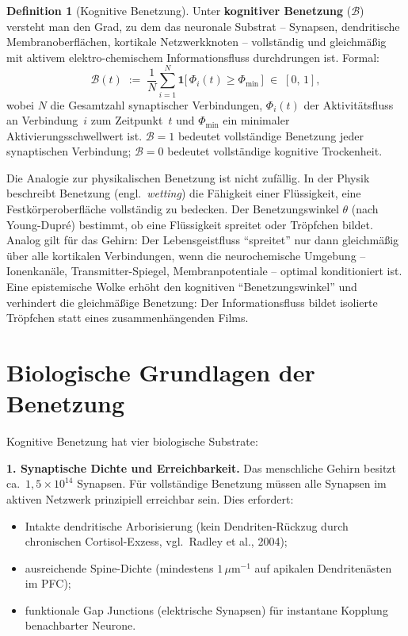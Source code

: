 ﻿\documentclass[12pt,a4paper]{report}
\theoremstyle{plain}
\theoremstyle{definition}
\newtheorem{definition}[theorem]{Definition}
\theoremstyle{remark}
\begin{document}
	\begin{definition}[Kognitive Benetzung]
		\label{def:benetzung}
		Unter \textbf{kognitiver Benetzung} ($\mathcal{B}$) versteht man den Grad,
		zu dem das neuronale Substrat -- Synapsen, dendritische Membranoberflächen,
		kortikale Netzwerkknoten -- vollständig und gleichmäßig mit aktivem
		elektro-chemischem Informationsfluss durchdrungen ist.
		Formal:
		\[
		\mathcal{B}(t) \;:=\; \frac{1}{N}\sum_{i=1}^{N}
		\mathbf{1}\bigl[\,\Phi_i(t) \geq \Phi_{\min}\,\bigr]
		\;\in\; [0,\,1],
		\]
		wobei $N$ die Gesamtzahl synaptischer Verbindungen,
		$\Phi_i(t)$ der Aktivitätsfluss an Verbindung~$i$ zum Zeitpunkt~$t$
		und $\Phi_{\min}$ ein minimaler Aktivierungsschwellwert ist.
		$\mathcal{B} = 1$ bedeutet vollständige Benetzung jeder synaptischen
		Verbindung; $\mathcal{B} = 0$ bedeutet vollständige kognitive Trockenheit.
	\end{definition}

	Die Analogie zur physikalischen Benetzung ist nicht zufällig.
	In der Physik beschreibt Benetzung (engl.\ \textit{wetting}) die Fähigkeit
	einer Flüssigkeit, eine Festkörperoberfläche vollständig zu bedecken.
	Der Benetzungswinkel $\theta$ (nach Young-Dupré) bestimmt, ob eine
	Flüssigkeit spreitet oder Tröpfchen bildet. Analog gilt für das Gehirn:
	Der Lebensgeistfluss ``spreitet'' nur dann gleichmäßig über alle
	kortikalen Verbindungen, wenn die neurochemische Umgebung -- Ionenkanäle,
	Transmitter-Spiegel, Membranpotentiale -- optimal konditioniert ist.
	Eine epistemische Wolke erhöht den kognitiven ``Benetzungswinkel''
	und verhindert die gleichmäßige Benetzung: Der Informationsfluss
	bildet isolierte Tröpfchen statt eines zusammenhängenden Films.

	\section{Biologische Grundlagen der Benetzung}

	Kognitive Benetzung hat vier biologische Substrate:

	\textbf{1. Synaptische Dichte und Erreichbarkeit.}
	Das menschliche Gehirn besitzt ca.\ $1{,}5 \times 10^{14}$ Synapsen.
	Für vollständige Benetzung müssen alle Synapsen im aktiven Netzwerk
	prinzipiell erreichbar sein. Dies erfordert:
	\begin{itemize}
		\item Intakte dendritische Arborisierung (kein Dendriten-Rückzug durch
		chronischen Corti\-sol-Exzess, vgl.\ Radley et al., 2004);
		\item ausreichende Spine-Dichte (mindestens $1\,\mu\mathrm{m}^{-1}$
		auf apikalen Dendritenästen im PFC);
		\item funktionale Gap Junctions (elektrische Synapsen) für
		instantane Kopplung benachbarter Neurone.
	\end{itemize}
\end{document}
